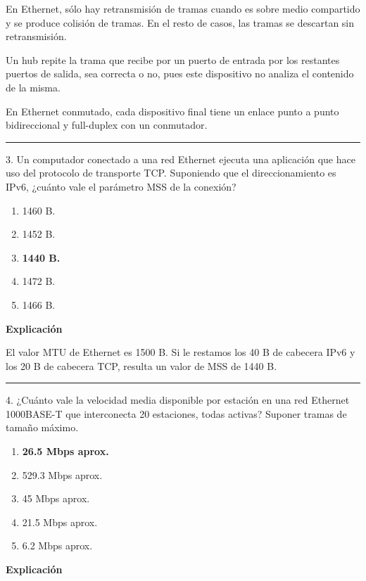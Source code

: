 \documentclass[10pt,a4paper]{article}
\begin{document}
En Ethernet, sólo hay retransmisión de tramas cuando es sobre medio compartido y se produce colisión de tramas.
En el resto de casos, las tramas se descartan sin retransmisión.

Un hub repite la trama que recibe por un puerto de entrada por los restantes puertos de salida, sea correcta o
no, pues este dispositivo no analiza el contenido de la misma.

En Ethernet conmutado, cada dispositivo final tiene un enlace punto a punto bidireccional y full-duplex con un
conmutador.

\vspace{15pt} \hrule \vspace{15pt}




3. Un computador conectado a una red Ethernet ejecuta una aplicación que hace uso del protocolo de transporte
TCP. Suponiendo que el direccionamiento es IPv6, ¿cuánto vale el parámetro MSS de la conexión?

\begin{enumerate}[label=\alph*]
    \item 1460 B.
    \item 1452 B.
    \item \textbf{1440 B.}
    \item 1472 B.
    \item 1466 B.
\end{enumerate}
\textbf{Explicación}

El valor MTU de Ethernet es 1500 B. Si le restamos los 40 B de cabecera IPv6 y los 20 B de cabecera TCP,
resulta un valor de MSS de 1440 B.

\vspace{15pt} \hrule \vspace{15pt}




4. ¿Cuánto vale la velocidad media disponible por estación en una red Ethernet 1000BASE-T que interconecta 20
estaciones, todas activas? Suponer tramas de tamaño máximo.

\begin{enumerate}[label=\alph*]
    \item \textbf{26.5 Mbps aprox.}
    \item 529.3 Mbps aprox.
    \item 45 Mbps aprox.
    \item 21.5 Mbps aprox.
    \item 6.2 Mbps aprox.
\end{enumerate}
\textbf{Explicación}
\end{document}

